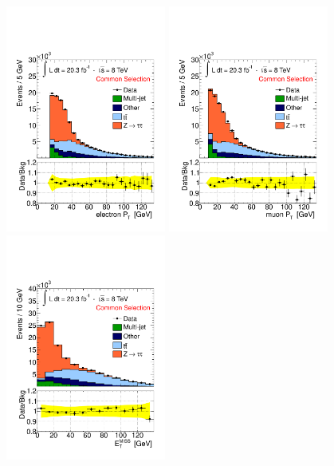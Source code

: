 \begin{figure}[p]
     \begin{center}
            \includegraphics[width=0.47\textwidth]{figure/final_plots/std_presel_ele_pt.pdf}
            \includegraphics[width=0.47\textwidth]{figure/final_plots/std_presel_muon_pt.pdf}
            \includegraphics[width=0.47\textwidth]{figure/final_plots/std_presel_EtMiss.pdf}

\end{center}
\end{figure}
